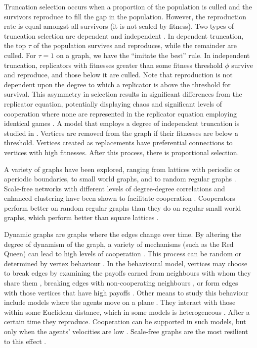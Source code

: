 \documentclass[reprint,aps,pre,twocolumn]{revtex4-1}
\begin{document}
Truncation selection occurs when a proportion of the population is culled and the survivors reproduce to fill the gap in the population. However, the reproduction rate is equal amongst all survivors (it is not scaled by fitness). Two types of truncation selection are dependent and independent \cite{morsky16}. In dependent truncation, the top $\tau$ of the population survives and reproduces, while the remainder are culled. For $\tau = 1$ on a graph, we have the ``imitate the best'' rule. In independent truncation, replicators with fitnesses greater than some fitness threshold $\phi$ survive and reproduce, and those below it are culled. Note that reproduction is not dependent upon the degree to which a replicator is above the threshold for survival. This asymmetry in selection results in significant differences from the replicator equation, potentially displaying chaos and significant levels of cooperation where none are represented in the replicator equation employing identical games \cite{ficici05, ficici07, fogel98, fogel11,morsky16}. A model that employs a degree of independent truncation is studied in \cite{zhang11}. Vertices are removed from the graph if their fitnesses are below a threshold. Vertices created as replacements have preferential connections to vertices with high fitnesses. After this process, there is proportional selection.

A variety of graphs have been explored, ranging from lattices with periodic or aperiodic boundaries, to small world graphs, and to random regular graphs \cite{buesser12}. Scale-free networks with different levels of degree-degree correlations and enhanced clustering have been shown to facilitate cooperation \cite{pusch08}. Cooperators perform better on random regular graphs than they do on regular small world graphs, which perform better than square lattices \cite{hauert05}.

Dynamic graphs are graphs where the edges change over time. By altering the degree of dynamism of the graph, a variety of mechanisms (such as the Red Queen) can lead to high levels of cooperation \cite{szolnoki09}. This process can be random or determined by vertex behaviour \cite{wardil14}. In the behavioural model, vertices may choose to break edges by examining the payoffs earned from neighbours with whom they share them \cite{cavaliere12,pacheco08}, breaking edges with non-cooperating neighbours \cite{rezaei12}, or form edges with those vertices that have high payoffs \cite{wu10,wu11}. Other means to study this behaviour include models where the agents move on a plane \cite{antonioni14, gomez07}. They interact with those within some Euclidean distance, which in some models is heterogeneous \cite{zhang11}. After a certain time they reproduce. Cooperation can be supported in such models, but only when the agents' velocities are low \cite{meloni09}. Scale-free graphs are the most resilient to this effect \cite{kun09}.
\end{document}
